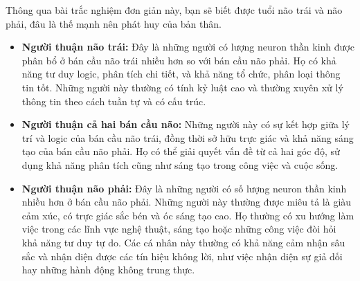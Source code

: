 Thông qua bài trắc nghiệm đơn giản này, bạn sẽ biết được tuổi não trái và não phải, đâu là thế mạnh nên phát huy của bản thân.
\begin{itemize}
  \item \textbf{Người thuận não trái:} Đây là những người có lượng neuron thần kinh được phân bổ ở bán cầu não trái nhiều hơn so với bán cầu não phải. Họ có khả năng tư duy logic, phân tích chi tiết, và khả năng tổ chức, phân loại thông tin tốt. Những người này thường có tính kỷ luật cao và thường xuyên xử lý thông tin theo cách tuần tự và có cấu trúc.
  
  \item \textbf{Người thuận cả hai bán cầu não:} Những người này có sự kết hợp giữa lý trí và logic của bán cầu não trái, đồng thời sở hữu trực giác và khả năng sáng tạo của bán cầu não phải. Họ có thể giải quyết vấn đề từ cả hai góc độ, sử dụng khả năng phân tích cũng như sáng tạo trong công việc và cuộc sống.
  
  \item \textbf{Người thuận não phải:} Đây là những người có số lượng neuron thần kinh nhiều hơn ở bán cầu não phải. Những người này thường được miêu tả là giàu cảm xúc, có trực giác sắc bén và óc sáng tạo cao. Họ thường có xu hướng làm việc trong các lĩnh vực nghệ thuật, sáng tạo hoặc những công việc đòi hỏi khả năng tư duy tự do. Các cá nhân này thường có khả năng cảm nhận sâu sắc và nhận diện được các tín hiệu không lời, như việc nhận diện sự giả dối hay những hành động không trung thực.
\end{itemize}

